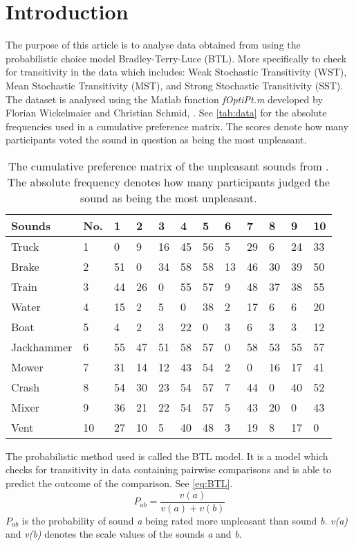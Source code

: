 \section*{Introduction}
\label{Introduktion}
%
The purpose of this article is to analyse data obtained from \textcite{Ellermeier2004} using the probabilistic choice model Bradley-Terry-Luce (BTL). More specifically to check for transitivity in the data which includes: Weak Stochastic Transitivity (WST), Mean Stochastic Transitivity (MST), and Strong Stochastic Transitivity (SST). The dataset is analysed using the Matlab function \textit{fOptiPt.m} developed by Florian Wickelmaier and Christian Schmid, \parencite{Wickelmaier2004}. See \autoref{tab:data} for the absolute frequencies used in a cumulative preference matrix. The scores denote how many participants voted the sound in question as being the most unpleasant.
%
\begin{table}[H]
\centering
\begin{tabular}{@{}llllllllllll@{}}
\toprule
Sounds     & No. & 1  & 2  & 3  & 4  & 5  & 6  & 7  & 8  & 9  & 10 \\ \midrule
Truck      & 1   & 0  & 9  & 16 & 45 & 56 & 5  & 29 & 6  & 24 & 33 \\
Brake      & 2   & 51 & 0  & 34 & 58 & 58 & 13 & 46 & 30 & 39 & 50 \\
Train      & 3   & 44 & 26 & 0  & 55 & 57 & 9  & 48 & 37 & 38 & 55 \\
Water      & 4   & 15 & 2  & 5  & 0  & 38 & 2  & 17 & 6  & 6  & 20 \\
Boat       & 5   & 4  & 2  & 3  & 22 & 0  & 3  & 6  & 3  & 3  & 12 \\
Jackhammer & 6   & 55 & 47 & 51 & 58 & 57 & 0  & 58 & 53 & 55 & 57 \\
Mower      & 7   & 31 & 14 & 12 & 43 & 54 & 2  & 0  & 16 & 17 & 41 \\
Crash      & 8   & 54 & 30 & 23 & 54 & 57 & 7  & 44 & 0  & 40 & 52 \\
Mixer      & 9   & 36 & 21 & 22 & 54 & 57 & 5  & 43 & 20 & 0  & 43 \\
Vent       & 10  & 27 & 10 & 5  & 40 & 48 & 3  & 19 & 8  & 17 & 0  \\ \bottomrule
\end{tabular}
\caption{The cumulative preference matrix of the unpleasant sounds from \textcite{Ellermeier2004}. The absolute frequency denotes how many participants judged the sound as being the most unpleasant.}
\label{tab:data}
\end{table} 
\noindent 
%
The probabilistic method used is called the BTL model. It is a model which checks for transitivity in data containing pairwise comparisons and is able to predict the outcome of the comparison. See \autoref{eq:BTL}.
%
\begin{equation}
P_{ab} =\frac{v(a)}{v(a)+v(b)} 
\label{eq:BTL}
\end{equation}
%
$P_{ab}$ is the probability of sound \textit{a} being rated more unpleasant than sound \textit{b}. \textit{v(a)} and \textit{v(b)} denotes the scale values of the sounds \textit{a} and \textit{b}.

